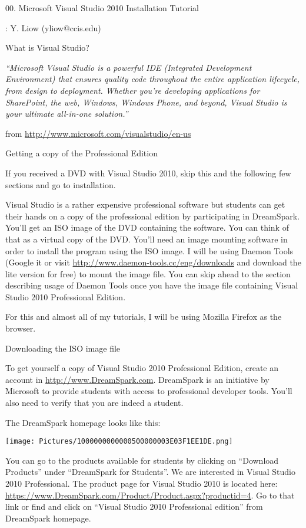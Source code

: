 \documentclass[
]{article}
\author{}
\date{}
\begin{document}
00. Microsoft Visual Studio 2010 Installation Tutorial

: Y. Liow (yliow@ccis.edu)

What is Visual Studio?

\emph{``Microsoft Visual Studio is a powerful IDE (Integrated
Development Environment) that ensures quality code throughout the entire
application lifecycle, from design to deployment. Whether you're
developing applications for SharePoint, the web, Windows, Windows Phone,
and beyond, Visual Studio is your ultimate all-in-one solution.''}

from \url{http://www.microsoft.com/visualstudio/en-us}

Getting a copy of the Professional Edition

If you received a DVD with Visual Studio 2010, skip this and the
following few sections and go to installation.

Visual Studio is a rather expensive professional software but students
can get their hands on a copy of the professional edition by
participating in DreamSpark. You'll get an ISO image of the DVD
containing the software. You can think of that as a virtual copy of the
DVD. You'll need an image mounting software in order to install the
program using the ISO image. I will be using Daemon Tools (Google it or
visit \url{http://www.daemon-tools.cc/eng/downloads} and download the
lite version for free) to mount the image file. You can skip ahead to
the section describing usage of Daemon Tools once you have the image
file containing Visual Studio 2010 Professional Edition.

For this and almost all of my tutorials, I will be using Mozilla Firefox
as the browser.

Downloading the ISO image file

To get yourself a copy of Visual Studio 2010 Professional Edition,
create an account in
\href{http://www.dreamspark.com/}{http://www.DreamSpark.com}. DreamSpark
is an initiative by Microsoft to provide students with access to
professional developer tools. You'll also need to verify that you are
indeed a student.

The DreamSpark homepage looks like this:

\texttt{[image: Pictures/1000000000000500000003E03F1EE1DE.png]}

You can go to the products available for students by clicking on
``Download Products'' under ``DreamSpark for Students''. We are
interested in Visual Studio 2010 Professional. The product page for
Visual Studio 2010 is located here:
\href{https://www.dreamspark.com/Product/Product.aspx?productid=4}{https://www.DreamSpark.com/Product/Product.aspx?productid=4}.
Go to that link or find and click on ``Visual Studio 2010 Professional
edition'' from DreamSpark homepage.
\end{document}
